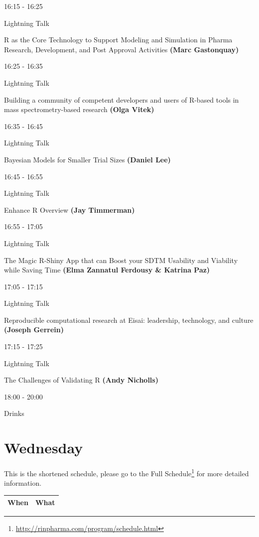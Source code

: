 \documentclass[]{book}
\renewcommand{\href}[2]{#2\footnote{\url{#1}}}
\theoremstyle{definition}
\theoremstyle{definition}
\theoremstyle{definition}
\theoremstyle{remark}
\begin{document}
16:15 - 16:25

Lightning Talk

R as the Core Technology to Support Modeling and Simulation in Pharma
Research, Development, and Post Approval Activities \textbf{(Marc
Gastonquay)}

16:25 - 16:35

Lightning Talk

Building a community of competent developers and users of R-based tools
in mass spectrometry-based research \textbf{(Olga Vitek)}

16:35 - 16:45

Lightning Talk

Bayesian Models for Smaller Trial Sizes \textbf{(Daniel Lee)}

16:45 - 16:55

Lightning Talk

Enhance R Overview \textbf{(Jay Timmerman)}

16:55 - 17:05

Lightning Talk

The Magic R-Shiny App that can Boost your SDTM Usability and Viability
while Saving Time \textbf{(Elma Zannatul Ferdousy \& Katrina Paz)}

17:05 - 17:15

Lightning Talk

Reproducible computational research at Eisai: leadership, technology,
and culture \textbf{(Joseph Gerrein)}

17:15 - 17:25

Lightning Talk

The Challenges of Validating R \textbf{(Andy Nicholls)}

18:00 - 20:00

Drinks

\hypertarget{wednesday}{%
\section{Wednesday}\label{wednesday}}

This is the shortened schedule, please go to
\href{http://rinpharma.com/program/schedule.html}{the Full Schedule} for
more detailed information.

\begin{longtable}[]{@{}ll@{}}
\toprule
When & What\tabularnewline
\midrule
\endhead
\bottomrule
\end{longtable}
\end{document}
